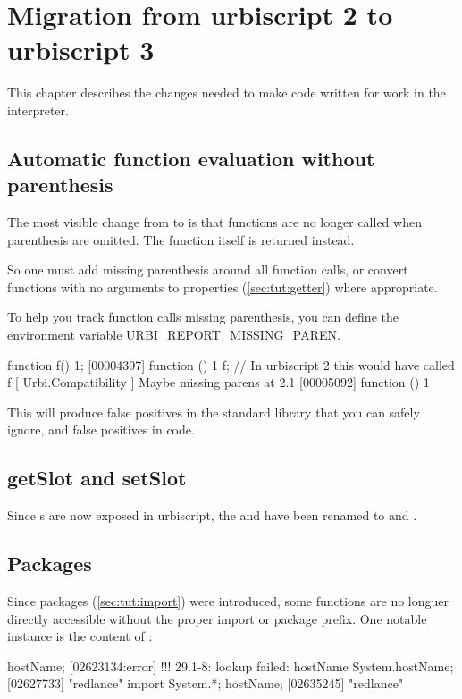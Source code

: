 
\chapter{Migration from urbiscript 2 to urbiscript 3}
\label{sec:guide:k2tok3}
This chapter describes the changes needed to make \us code written for
 work in the  interpreter.

\section{Automatic function evaluation without parenthesis}

The most visible change from  to  is that functions are no
longer called when parenthesis are omitted. The function itself is
returned instead.

So one must add missing parenthesis around all function calls, or convert
functions with no arguments to properties (\ref{sec:tut:getter}) where
appropriate.

To help you track function calls missing parenthesis, you can define
the environment variable URBI\_REPORT\_MISSING\_PAREN.

\begin{urbiunchecked}
function f() {1};
[00004397] function () { 1 }
f; // In urbiscript 2 this would have called f
[  Urbi.Compatibility   ] Maybe missing parens at 2.1
[00005092] function () { 1 }
\end{urbiunchecked}

This will produce false positives in the \us standard library that you can
safely ignore, and false positives in  code.

\section{getSlot and setSlot}

Since s are now exposed in urbiscript, the 
 and  have been renamed to
 and .

\section{Packages}

Since packages (\ref{sec:tut:import}) were introduced, some functions are
no longuer directly accessible without the proper import or package prefix.
One notable instance is the content of :

\begin{urbiunchecked}
hostName;
[02623134:error] !!! 29.1-8: lookup failed: hostName
System.hostName;
[02627733] "redlance"
import System.*;
hostName;
[02635245] "redlance"
\end{urbiunchecked}
